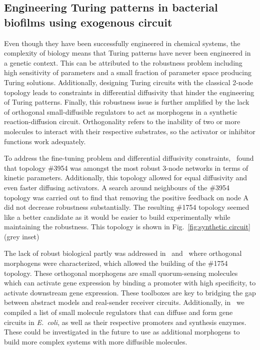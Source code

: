 \subsection{Engineering Turing patterns in bacterial biofilms using exogenous circuit}
Even though they have been successfully engineered in chemical systems, the complexity of biology means that Turing patterns have never been engineered in a genetic context.
This can be attributed to the robustness problem including high sensitivity of parameters and a small fraction of parameter space producing Turing solutions.
Additionally, designing Turing circuits with the classical 2-node topology leads to constraints in differential diffusivity that hinder the engineering of Turing patterns.
Finally, this robustness issue is further amplified by the lack of orthogonal small-diffusible regulators to act as morphogens in a synthetic reaction-diffusion circuit.
Orthogonality refers to the inability of two or more molecules to interact with their respective substrates, so the activator or inhibitor functions work adequately.
%

To address the fine-tuning problem and differential diffusivity constraints,~\cite{Scholes2019} found that topology \#3954 was amongst the most robust 3-node networks in terms of kinetic parameters.
Additionally, this topology allowed for equal diffusivity and even faster diffusing activators.
A search around neighbours of the \#3954 topology was carried out to find that removing the positive feedback on node A did not decrease robustness substantially.
The resulting \#1754 topology seemed like a better candidate as it would be easier to build experimentally while maintaining the robustness.
This topology is shown in Fig.~\ref{fig:synthetic circuit} (grey inset)

The lack of robust biological partly was addressed in~\cite{Meyer2019} and~\cite{Du2020} where orthogonal morphogens were characterized, which allowed the building of the \#1754 topology.
These orthogonal morphogens are small quorum-sensing molecules which can activate gene expression by binding a promoter with high specificity, to activate downstream gene expression.
These toolboxes are key to bridging the gap between abstract models and real-sender receiver circuits.
Additionally, in~\cite{oliverhuidobro} we compiled a list of small molecule regulators that can diffuse and form gene circuits in \textit{E.~coli}, as well as their respective promoters and synthesis enzymes.
These could be investigated in the future to use as additional morphogens to build more complex systems with more diffusible molecules.

